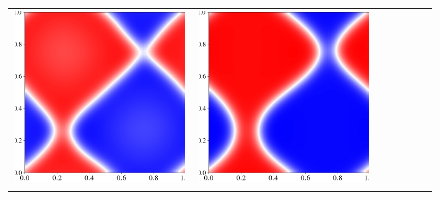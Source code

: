 \documentclass[12pt, reqno]{report}
\theoremstyle{definition}
\theoremstyle{remark}
\begin{document}
\begin{figure}[H]
\begin{tabular}{rccccc}
        \includegraphics[align = c, height=\subheight]{media_paper/CH_cmap_FD_n=200.png} & 
        \includegraphics[align = c, height=\subheight]{media_paper/CH_cmap_FD_n=500.png} & 

\end{tabular}
\end{figure}
\end{document}
